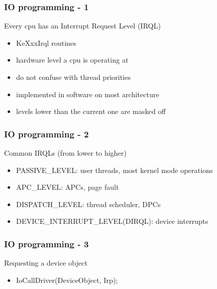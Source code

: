 \begin{frame}
 \frametitle{IO programming - 1}

 Every cpu has an Interrupt Request Level (IRQL)

 \begin{itemize}
  \item KeXxxIrql routines
  \item hardware level a cpu is operating at
  \item do not confuse with thread priorities
  \item implemented in software on most architecture
  \item levels lower than the current one are masked off
 \end{itemize}

\end{frame}


\begin{frame}
 \frametitle{IO programming - 2}

 Common IRQLs (from lower to higher)

 \begin{itemize}
  \item PASSIVE\_LEVEL: user threads, most kernel mode operations
  \item APC\_LEVEL: APCs, page fault
  \item DISPATCH\_LEVEL: thread scheduler, DPCs
  \item DEVICE\_INTERRUPT\_LEVEL(DIRQL): device interrupts
 \end{itemize}

\end{frame}


\begin{frame}
 \frametitle{IO programming - 3}

 Requesting a device object

 \begin{itemize}
  \item IoCallDriver(DeviceObject, Irp);
 \end{itemize}

\end{frame}


